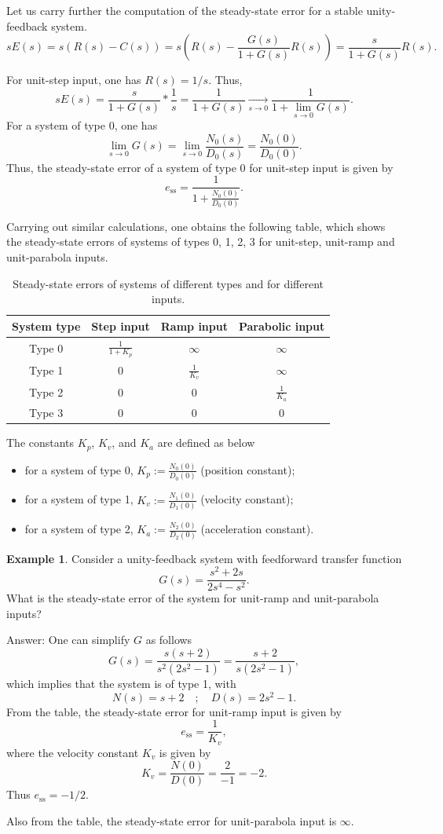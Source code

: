 \documentclass[a4paper,11pt]{report}
\theoremstyle{definition}
\newcommand{\sse}{\mathrm{ss}}
\newtheorem{mdexample}{Example}
\newenvironment{example}%
  {\vspace{0.1cm}\begin{mdframed}[backgroundcolor=lightgray]\begin{mdexample}}%
  {\end{mdexample}\end{mdframed}\vspace{0.1cm}}
\begin{document}
Let us carry further the computation of the steady-state error for a
stable unity-feedback system.
\[
sE(s) = s(R(s)-C(s)) = s\left(R(s)-\frac{G(s)}{1+G(s)}R(s)\right)=\frac{s}{1+G(s)}R(s).
\]

For unit-step input, one has $R(s)=1/s$. Thus,
\[
sE(s) = \frac{s}{1+G(s)}*\frac{1}{s} = \frac{1}{1+G(s)}
\xrightarrow[s\to 0]{}\frac{1}{1+\lim_{s\to 0}G(s)}.
\]
For a system of type 0, one has
\[
\lim_{s\to 0}G(s) = \lim_{s\to 0}\frac{N_0(s)}{D_0(s)} = \frac{N_0(0)}{D_0(0)}.
\]
Thus, the steady-state error of a system of type 0 for unit-step input
is given by
\[
e_\sse = \frac{1}{1+\frac{N_0(0)}{D_0(0)}}.
\]

Carrying out similar calculations, one obtains the following table,
which shows the steady-state errors of systems of types 0, 1, 2, 3 for
unit-step, unit-ramp and unit-parabola inputs.

\begin{table}[htp]
  \centering
  \begin{tabular}{|c|c|c|c|}
    \hline
    System type&Step input&Ramp input&Parabolic input\\\hline
    Type 0&$\frac{1}{1+K_p}$&$\infty$&$\infty$\\\hline
    Type 1&0&$\frac{1}{K_v}$&$\infty$\\\hline
    Type 2&0&0&$\frac{1}{K_a}$\\\hline
    Type 3&0&0&0\\\hline
  \end{tabular}
  \caption{Steady-state errors of systems of different types and for
    different inputs.}
  \label{tab:systype}
\end{table}

The constants $K_p$, $K_v$, and $K_a$ are defined as below
\begin{itemize}
\item for a system of type 0, $K_p:=\frac{N_0(0)}{D_0(0)}$ (position constant);
\item for a system of type 1, $K_v:=\frac{N_1(0)}{D_1(0)}$ (velocity constant);
\item for a system of type 2, $K_a:=\frac{N_2(0)}{D_2(0)}$
  (acceleration constant).
\end{itemize}

\begin{example}
  Consider a unity-feedback system with feedforward transfer function
  \[
  G(s) = \frac{s^2+2s}{2s^4-s^2}.
  \]
  What is the steady-state error of the system for unit-ramp and
  unit-parabola inputs?

  Answer: One can simplify $G$ as follows
  \[
  G(s) = \frac{s(s+2)}{s^2(2s^2-1)} =  \frac{s+2}{s(2s^2-1)},
  \]
  which implies that the system is of type 1, with 
  \[
  N(s) = s+2 \quad ; \quad D(s) = 2s^2-1.
  \]
  From the table, the steady-state error for unit-ramp input is given
  by
  \[
  e_\sse=\frac{1}{K_v},
  \]
  where the velocity constant $K_v$ is given by
  \[
  K_v = \frac{N(0)}{D(0)} = \frac{2}{-1} = -2.
  \]
  Thus $e_\sse = -1/2$.

  Also from the table, the steady-state error for unit-parabola input
  is $\infty$.
\end{example}
\end{document}
